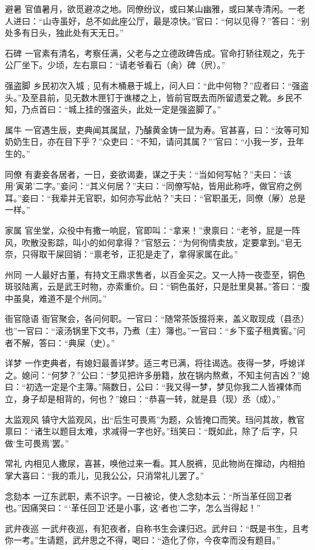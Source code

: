 \documentclass[12pt,UTF8]{ctexbook}
\begin{document}
避暑
官值暑月，欲觅避凉之地。同僚纷议，或曰某山幽雅，或曰某寺清闲。一老人进曰：“山寺虽好，总不如此座公厅，最是凉快。”官曰：“何以见得？”答曰：“别处多有日头，独此处有天无日。”

石碑
一官素有清名，考察任满，父老与之立德政碑告成。官命打轿往观之，先于公厂坐下。少顷，左右禀曰：“请老爷看石（肏）碑（屄）。”

强盗脚
乡民初次入城﹔见有木桶悬于城上，问人曰：“此中何物？”应者曰：“强盗头。”及至县前，见无数木匣钉于谯楼之上，皆前官既去而所留遗爱之靴。乡民不知，乃点首曰：“城上挂的强盗头，此处一定是强盗脚了。”

属牛
一官遇生辰，吏典闻其属鼠，乃醵黄金铸一鼠为寿。官甚喜，曰：“汝等可知奶奶生日，亦在目下乎？”众吏曰：“不知，请问其属？”’官曰：“小我一岁，丑年生的。”

同僚
有妻妾各居者，一日，妾欲谒妻，谋之于夫：“当如何写帖？”夫曰：“该用‘寅弟’二字。”妾问：“其义何居？”夫曰：“同僚写帖，皆用此称呼，做官府之例耳。”妾曰：“我辈并无官职，如何亦写此帖？”夫曰：“官职虽无，同僚（屪）总是一样。”

家属
官坐堂，众役中有撒一响屁，官即叫：“拿来！”隶禀曰：“老爷，屁是一阵风，吹散没影踪，叫小的如何拿得？”官怒云：“为何徇情卖放，定要拿到。”皂无奈，只得取干屎回销：“禀老爷，正犯是走了，拿得家属在此。”

州同
一人最好古董，有持文王鼎求售者，以百金买之。又一人持一夜壶至，铜色斑驳陆离，云是武王时物，亦索重价。曰：“铜色虽好，只是肚里臭甚。”答曰：“腹中虽臭，难道不是个州同。”

衙官隐语
衙官聚会，各问何职。一官曰：“随常茶饭掇将来，盖义取现成（县丞）也”一官曰：“滚汤锅里下文书，乃煮（主）簿也。”一官曰：“乡下蛮子租粪窖。”问者不解，答曰：“典屎（史）。”

详梦
一作吏典者，有媳妇最善详梦。适三考已满，将往谒选。夜得一梦，呼媳详之。媳问：“何梦？”公曰：“梦见把许多册籍，放在锅内熬煮，不知主何吉凶？”媳曰：“初选一定是个主簿。”隔数日，公曰：“我又得一梦，梦见你我二人皆裸体而立，身子却是相背的，何也？”媳曰：“恭喜一转，就是县（现）丞（成）。”

太监观风
镇守大监观风，出“后生可畏焉”为题，众皆掩口而笑。珰问其故，教官禀曰：“诸生以题目太难，求减得一字也好。”珰笑曰：“既如此，除了‘后’字，只做‘生可畏焉’罢。”

常礼
内相见人撒尿，喜甚，唤他过来一看。其人脱裤，见此物尚在撺动，内相拍掌大喜曰：“我的乖儿，见我公公，只消常礼儿罢了。”

念劾本
一辽东武职，素不识字。一日被论，使人念劾本云：“所当革任回卫者也。”因痛哭曰：“‘革任回卫’还是小事，这‘者也’二字，怎么当得起！”

武弁夜巡
一武弁夜巡，有犯夜者，自称书生会课归迟。武弁曰：“既是书生，且考你一考。”生请题，武弁思之不得，喝曰：“造化了你，今夜幸而没有题目。”
\end{document}
